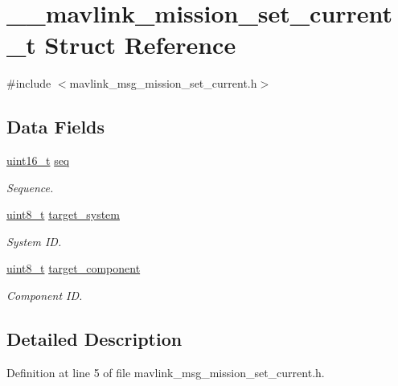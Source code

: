 \hypertarget{struct____mavlink__mission__set__current__t}{\section{\-\_\-\-\_\-mavlink\-\_\-mission\-\_\-set\-\_\-current\-\_\-t Struct Reference}
\label{struct____mavlink__mission__set__current__t}
}


{\ttfamily \#include $<$mavlink\-\_\-msg\-\_\-mission\-\_\-set\-\_\-current.\-h$>$}

\subsection*{Data Fields}
\begin{DoxyCompactItemize}
\item 
\hyperlink{stdint_8h_a273cf69d639a59973b6019625df33e30}{uint16\-\_\-t} \hyperlink{struct____mavlink__mission__set__current__t_add7d7aa3830c71875706ac4e8e5206aa}{seq}
\begin{DoxyCompactList}\small\item\em Sequence. \end{DoxyCompactList}\item 
\hyperlink{stdint_8h_aba7bc1797add20fe3efdf37ced1182c5}{uint8\-\_\-t} \hyperlink{struct____mavlink__mission__set__current__t_aa9499477334421047ddb7b3d8e4b7794}{target\-\_\-system}
\begin{DoxyCompactList}\small\item\em System I\-D. \end{DoxyCompactList}\item 
\hyperlink{stdint_8h_aba7bc1797add20fe3efdf37ced1182c5}{uint8\-\_\-t} \hyperlink{struct____mavlink__mission__set__current__t_a367ad0a39fa1fc6d06ee1aa06a9a6908}{target\-\_\-component}
\begin{DoxyCompactList}\small\item\em Component I\-D. \end{DoxyCompactList}\end{DoxyCompactItemize}


\subsection{Detailed Description}


Definition at line 5 of file mavlink\-\_\-msg\-\_\-mission\-\_\-set\-\_\-current.\-h.




